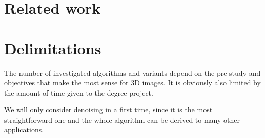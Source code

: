 \section{Related work}



\section{Delimitations}

The number of investigated algorithms and variants depend on the pre-study and objectives that make the most sense for 3D images.
It is obviously also limited by the amount of time given to the degree project.

We will only consider denoising in a first time, since it is the most straightforward one and the whole algorithm can be derived to many other applications.
